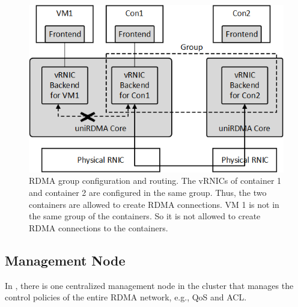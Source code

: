 

\begin{figure}[!ht]
	\centering
	\includegraphics[width=1.0\linewidth]{images/route-config}
	\caption{RDMA group configuration and routing. The vRNICs of container 1 and container 2 are configured in the same group. Thus, the two containers are allowed to create RDMA connections. VM 1 is not in the same group of the containers. So it is not allowed to create RDMA connections to the containers.}
	\label{fig:route-config}
\end{figure}

\subsection{Management Node}

In \sys, there is one centralized management node in the cluster that manages the control policies of the entire RDMA network, e.g., QoS and ACL.


